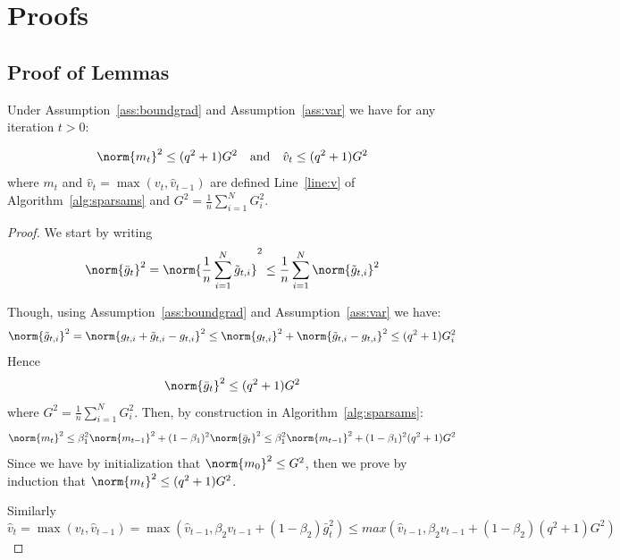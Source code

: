 \documentclass[11pt]{article}
\begin{document}
\section{Proofs}

\subsection{Proof of Lemmas}

\begin{Lemma*}
Under Assumption~\ref{ass:boundgrad} and Assumption~\ref{ass:var} we have for any iteration $t >0$:

\begin{equation}
\norm{m_t}^2 \leq (q^2+1) G^2 \quad \textrm{and} \quad \hat v_t \leq (q^2+1) G^2
\end{equation}
where $m_t$ and $\hat v_t=\max(v_t,\hat v_{t-1})$ are defined Line~\ref{line:v} of Algorithm~\ref{alg:sparsams} and $G^2 = \frac{1}{n}\sum_{i=1}^N  G_{i}^2$.
\end{Lemma*}

\begin{proof}
We start by writing
\begin{equation}
\norm{\bar g_t}^2  = \norm{\frac{1}{n}\sum_{i=1}^N \tilde g_{t,i} }^2 \leq \frac{1}{n}\sum_{i=1}^N \norm{\tilde g_{t,i} }^2
\end{equation}

Though, using Assumption~\ref{ass:boundgrad} and Assumption~\ref{ass:var} we have:
\begin{equation}
\norm{\tilde g_{t,i} }^2  = \norm{g_{t,i}  + \tilde g_{t,i}  - g_{t,i}}^2 \leq \norm{g_{t,i} }^2 + \norm{\tilde g_{t,i}  - g_{t,i}}^2 \leq (q^2+1)G_i^2
\end{equation}
Hence
\begin{equation}
\norm{\bar g_t}^2  \leq (q^2+1) G^2
\end{equation}
where $G^2 = \frac{1}{n}\sum_{i=1}^N  G_{i}^2$.
Then, by construction in Algorithm~\ref{alg:sparsams}:
\begin{equation}
\norm{m_t}^2  \leq \beta_1^2 \norm{m_{t-1}}^2 + (1 - \beta_1)^2 \norm{\bar g_t}^2  \leq \beta_1^2 \norm{m_{t-1}}^2 + (1 - \beta_1)^2(q^2+1) G^2
\end{equation}
Since we have by initialization that $\norm{m_0}^2 \leq G^2$, then we prove by induction that $\norm{m_t}^2 \leq (q^2+1) G^2$.

Similarly
\begin{equation}
\hat v_t = \max(v_t,\hat v_{t-1}) = \max(\hat v_{t-1}, \beta_2 v_{t-1}+(1-\beta_2)\bar g_t^2) \leq  max(\hat v_{t-1}, \beta_2 v_{t-1}+(1-\beta_2)(q^2+1) G^2) 
\end{equation}
\end{proof}
\end{document}
